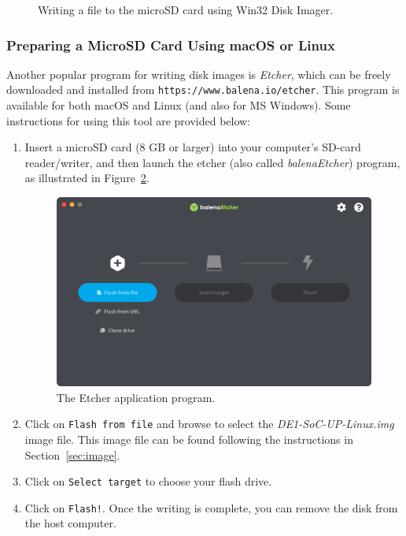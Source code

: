 \documentclass[11pt, twoside, pdftex]{article}
\begin{document}
\begin{enumerate}
\begin{figure} [h]
\begin{center}
\end{center}
\caption{Writing a file to the microSD card using Win32 Disk Imager.}
\label{fig:win32_disk_imager_4}
\end{figure}

\end{enumerate}

\subsubsection{Preparing a MicroSD Card Using macOS or Linux}

Another popular program for writing disk images is {\it Etcher}, which can be freely
downloaded and installed from \texttt{https://www.balena.io/etcher}. This program is 
available for both macOS and Linux (and also for MS Windows). Some instructions for using 
this tool are provided below:

\begin{enumerate}

\item Insert a microSD card (8 GB or larger) into your computer's SD-card reader/writer,
and then launch the etcher (also called {\it balenaEtcher}) program, as illustrated in
Figure~\ref{fig:etcher}.

\begin{figure} [b]
\begin{center}
\includegraphics[scale = 0.45]{figures/etcher.png}
\end{center}
\caption{The Etcher application program.}
\label{fig:etcher}
\end{figure}
\item Click on \texttt{Flash from file} and browse to select the 
\textit{DE1-SoC-UP-Linux.img} image file.  This image file can be found following the
instructions in Section~\ref{sec:image}.
\item Click on \texttt{Select target} to choose your flash drive.
\item Click on \texttt{Flash!}. Once the writing is complete, you can remove the disk from
the host computer.

\end{enumerate}
\end{document}
